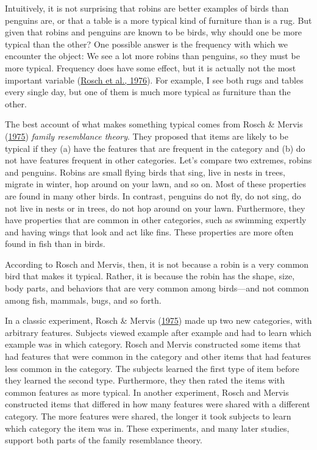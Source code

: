 \documentclass[
]{krantz}
\begin{document}
Intuitively, it is not surprising that robins are better examples of birds than penguins are, or that a table is a more typical kind of furniture than is a rug. But given that robins and penguins are known to be birds, why should one be more typical than the other? One possible answer is the frequency with which we encounter the object: We see a lot more robins than penguins, so they must be more typical. Frequency does have some effect, but it is actually not the most important variable (\protect\hyperlink{ref-Rosch1976}{Rosch et al., 1976}). For example, I see both rugs and tables every single day, but one of them is much more typical as furniture than the other.

The best account of what makes something typical comes from Rosch \& Mervis (\protect\hyperlink{ref-Rosch1975}{1975}) \emph{family resemblance theory}. They proposed that items are likely to be typical if they (a) have the features that are frequent in the category and (b) do not have features frequent in other categories. Let's compare two extremes, robins and penguins. Robins are small flying birds that sing, live in nests in trees, migrate in winter, hop around on your lawn, and so on. Most of these properties are found in many other birds. In contrast, penguins do not fly, do not sing, do not live in nests or in trees, do not hop around on your lawn. Furthermore, they have properties that are common in other categories, such as swimming expertly and having wings that look and act like fins. These properties are more often found in fish than in birds.

According to Rosch and Mervis, then, it is not because a robin is a very common bird that makes it typical. Rather, it is because the robin has the shape, size, body parts, and behaviors that are very common among birds---and not common among fish, mammals, bugs, and so forth.

In a classic experiment, Rosch \& Mervis (\protect\hyperlink{ref-Rosch1975}{1975}) made up two new categories, with arbitrary features. Subjects viewed example after example and had to learn which example was in which category. Rosch and Mervis constructed some items that had features that were common in the category and other items that had features less common in the category. The subjects learned the first type of item before they learned the second type. Furthermore, they then rated the items with common features as more typical. In another experiment, Rosch and Mervis constructed items that differed in how many features were shared with a different category. The more features were shared, the longer it took subjects to learn which category the item was in. These experiments, and many later studies, support both parts of the family resemblance theory.
\end{document}
